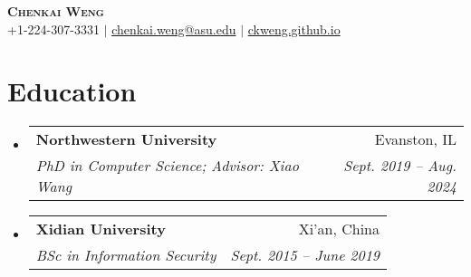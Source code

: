 \documentclass[letterpaper,11pt]{article}
\makeatletter
\newcommand{\resumeSubheading}[4]{
  \vspace{-2pt}\item
    \begin{tabular*}{0.97\textwidth}[t]{l@{\extracolsep{\fill}}r}
      \textbf{#1} & #2 \\
      \textit{\small#3} & \textit{\small #4} \\
    \end{tabular*}\vspace{-7pt}
}
\newcommand{\resumeSubHeadingListStart}{\begin{itemize}[leftmargin=0.15in, label={}]}
\newcommand{\resumeSubHeadingListEnd}{\end{itemize}}
\makeatother
\begin{document}

\begin{center}
    \textbf{\Huge \scshape Chenkai Weng} \\ \vspace{1pt}
    \small +1-224-307-3331 $|$ \href{mailto:ckweng@u.northwestern.edu}{chenkai.weng@asu.edu} $|$ 
    \href{https://ckweng.github.io}{ckweng.github.io}
\end{center}


\section{Education}
  \resumeSubHeadingListStart
    \resumeSubheading
      {Northwestern University}{Evanston, IL}
      {PhD in Computer Science; Advisor: Xiao Wang}{Sept. 2019 -- Aug. 2024}
    \resumeSubheading
      {Xidian University}{Xi'an, China}
      {BSc in Information Security}{Sept. 2015 -- June 2019}
  \resumeSubHeadingListEnd
\end{document}
